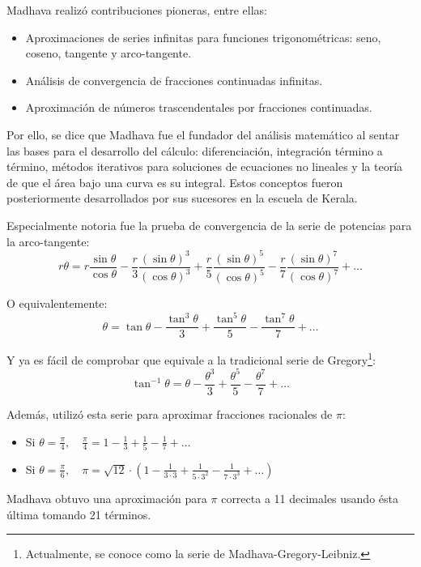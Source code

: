 \documentclass[a4paper, 11pt]{article}
\begin{document}
		Madhava realizó contribuciones pioneras, entre ellas:
		\begin{itemize}
			\item Aproximaciones de series infinitas para funciones trigonométricas: seno, coseno, tangente y arco-tangente.
			\item Análisis de convergencia de fracciones continuadas infinitas.
			\item Aproximación de números trascendentales por fracciones continuadas.
		\end{itemize}

		Por ello, se dice que Madhava fue el fundador del análisis matemático al sentar las bases para el desarrollo del
		cálculo: diferenciación, integración término a término, métodos iterativos para soluciones de ecuaciones no lineales
		y la teoría de que el área bajo una curva es su integral. Estos conceptos fueron posteriormente desarrollados por
		sus sucesores en la escuela de Kerala.
		
		Especialmente notoria fue la prueba de convergencia de la serie de potencias para la arco-tangente:
		$$r \theta = r \frac{\sin \theta}{\cos \theta} - \frac{r}{3} \frac{(\sin \theta)^3}{(\cos \theta)^3} +
		\frac{r}{5} \frac{(\sin \theta)^5}{(\cos \theta)^{5}} - \frac{r}{7} \frac{(\sin \theta)^7}{(\cos \theta)^7} + \dots $$

		O equivalentemente:
		$$\theta = \tan \theta - \frac{\tan^3 \theta}{3} + \frac{\tan^5 \theta}{5} - \frac{\tan^7 \theta}{7} + \dots$$
		
		Y ya es fácil de comprobar que equivale a la tradicional serie de Gregory\footnote{Actualmente, se conoce como
		la serie de Madhava-Gregory-Leibniz.}:
		$$\tan^{-1} \theta = \theta - \frac{\theta^3}{3} + \frac{\theta^5}{5} - \frac{\theta^7}{7} + \dots$$		

		Además, utilizó esta serie para aproximar fracciones racionales de $\pi$:
		\begin{itemize}
			\item Si $\displaystyle \theta = \frac{\pi}{4}, \quad \frac{\pi}{4} = 1 - \frac{1}{3} + \frac{1}{5}
			- \frac{1}{7} + \dots$
			\item Si $\displaystyle \theta = \frac{\pi}{6}, \quad \pi = \sqrt{12} \cdot \left(1 - \frac{1}{3 \cdot 3}
			+ \frac{1}{5 \cdot 3^2} - \frac{1}{7 \cdot 3^3} + \dots \right)$
		\end{itemize}
		
		Madhava obtuvo una aproximación para $\pi$ correcta a 11 decimales usando ésta última tomando 21 términos.
		
\end{document}
